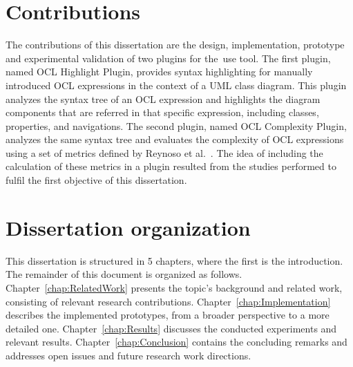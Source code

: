 \section{Contributions}

\label{sec:Introduction-Contributions}

The contributions of this dissertation are the design, implementation, prototype and experimental validation of two plugins for the~\gls{use} tool. The first plugin, named OCL Highlight Plugin, provides syntax highlighting for manually introduced OCL expressions in the context of a UML class diagram. This plugin analyzes the syntax tree of an OCL expression and highlights the diagram components that are referred in that specific expression, including classes, properties, and navigations. The second plugin, named OCL Complexity Plugin, analyzes the same syntax tree and evaluates the complexity of OCL expressions using a set of metrics defined by Reynoso et al.~\cite{Reynoso2005, Reynoso2010}. The idea of including the calculation of these metrics in a plugin resulted from the studies performed to fulfil the first objective of this dissertation.

\section{Dissertation organization}
\label{sec:Introduction-Organization}

This dissertation is structured in 5 chapters, where the first is the introduction. The remainder of this document is organized as follows. Chapter~\ref{chap:RelatedWork} presents the topic's background and related work, consisting of relevant research contributions. Chapter~\ref{chap:Implementation} describes the implemented prototypes, from a broader perspective to a more detailed one. Chapter~\ref{chap:Results} discusses the conducted experiments and relevant results. Chapter~\ref{chap:Conclusion} contains the concluding remarks and addresses open issues and future research work directions.

